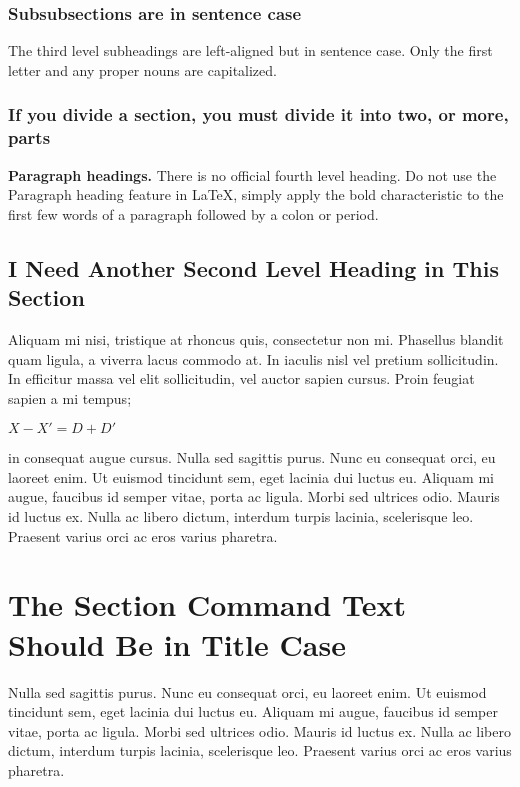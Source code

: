 \subsubsection{Subsubsections are in sentence case}
The third level subheadings are left-aligned but in sentence case. Only the first letter and any proper nouns are capitalized. %

\subsubsection{If you divide a section, you must divide it into two, or more, parts}

{\bf Paragraph headings.} There is no official fourth level heading. Do not use the Paragraph heading feature in LaTeX, simply apply the bold characteristic to the first few words of a paragraph followed by a colon or period.

\subsection{I Need Another Second Level Heading in This Section}

Aliquam mi nisi, tristique at rhoncus quis, consectetur non mi. Phasellus blandit quam ligula, a viverra lacus commodo at. In iaculis nisl vel pretium sollicitudin. In efficitur massa vel elit sollicitudin, vel auctor sapien cursus. Proin feugiat sapien a mi tempus;

 $ X-X'=D+D'$

 in consequat augue cursus. Nulla sed sagittis purus. Nunc eu consequat orci, eu laoreet enim. Ut euismod tincidunt sem, eget lacinia dui luctus eu. Aliquam mi augue, faucibus id semper vitae, porta ac ligula. Morbi sed ultrices odio. Mauris id luctus ex. Nulla ac libero dictum, interdum turpis lacinia, scelerisque leo. Praesent varius orci ac eros varius pharetra.

\section{The Section Command Text Should Be in Title Case}

Nulla sed sagittis purus. Nunc eu consequat orci, eu laoreet enim. Ut euismod tincidunt sem, eget lacinia dui luctus eu. Aliquam mi augue, faucibus id semper vitae, porta ac ligula. Morbi sed ultrices odio. Mauris id luctus ex. Nulla ac libero dictum, interdum turpis lacinia, scelerisque leo. Praesent varius orci ac eros varius pharetra.